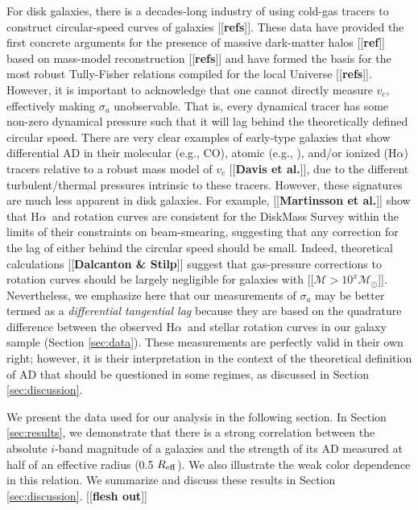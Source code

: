 \documentclass[apj,iop,revtex4,numberedappendix]{emulateapj}
\newcommand{\comment}[2][todo]{{\color{#1}[[{\bf #2}]]}}
\newcommand{\halpha}{H$\alpha$}
\begin{document}
For disk galaxies, there is a decades-long industry of using cold-gas
tracers to construct circular-speed curves of galaxies \comment{refs}.
These data have provided the first concrete arguments for the presence
of massive dark-matter halos \comment{ref} based on mass-model
reconstruction \comment{refs} and have formed the basis for the most
robust Tully-Fisher relations compiled for the local Universe
\comment{refs}.  However, it is important to acknowledge that one cannot
directly measure $v_c$, effectively making $\sigma_a$ unobservable.
That is, every dynamical tracer has some non-zero dynamical pressure
such that it will lag behind the theoretically defined circular speed.
There are very clear examples of early-type galaxies that show
differential AD in their molecular (e.g., CO), atomic (e.g.,
), and/or ionized (\halpha) tracers relative to a robust mass
model of $v_c$ \comment{Davis et al.}, due to the different
turbulent/thermal pressures intrinsic to these tracers.  However, these
signatures are much less apparent in disk galaxies.  For example,
\comment{Martinsson et al.} show that \halpha\ and  rotation
curves are consistent for the DiskMass Survey within the limits of their
constraints on beam-smearing, suggesting that any correction for the lag
of either behind the circular speed should be small.  Indeed,
theoretical calculations \comment{Dalcanton \& Stilp} suggest that
gas-pressure corrections to  rotation curves should be largely
negligible for galaxies with \comment{${\mathcal M} > 10^x {\mathcal
M}_\odot$}.  Nevertheless, we emphasize here that our measurements of
$\sigma_a$ may be better termed as a {\em differential tangential lag}
because they are based on the quadrature difference between the observed
\halpha\ and stellar rotation curves in our galaxy sample (Section
\ref{sec:data}).  These measurements are perfectly valid in their own
right; however, it is their interpretation in the context of the
theoretical definition of AD that should be questioned in some regimes,
as discussed in Section \ref{sec:discussion}.

We present the data used for our analysis in the following section.  In
Section \ref{sec:results}, we demonstrate that there is a strong
correlation between the absolute $i$-band magnitude of a galaxies and
the strength of its AD measured at half of an effective radius (0.5
$R_{\rm eff}$).  We also illustrate the weak color dependence in this
relation.  We summarize and discuss these results in Section
\ref{sec:discussion}. \comment{flesh out}
\end{document}
